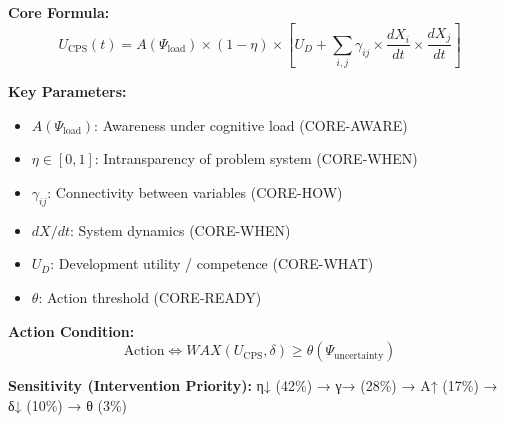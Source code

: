 
\begin{tcolorbox}[colback=blue!5!white, colframe=blue!75!black,
    title=Quick Reference: CPS in 10C]

\textbf{Core Formula:}
\begin{equation}
U_{\text{CPS}}(t) = A(\Psi_{\text{load}}) \times (1-\eta) \times \left[U_D + \sum_{i,j} \gamma_{ij} \times \frac{dX_i}{dt} \times \frac{dX_j}{dt}\right]
\label{eq:cps-utility}
\end{equation}

\textbf{Key Parameters:}
\begin{itemize}[nosep]
\item $A(\Psi_{\text{load}})$: Awareness under cognitive load (CORE-AWARE)
\item $\eta \in [0,1]$: Intransparency of problem system (CORE-WHEN)
\item $\gamma_{ij}$: Connectivity between variables (CORE-HOW)
\item $dX/dt$: System dynamics (CORE-WHEN)
\item $U_D$: Development utility / competence (CORE-WHAT)
\item $\theta$: Action threshold (CORE-READY)
\end{itemize}

\textbf{Action Condition:}
\begin{equation}
\text{Action} \iff WAX(U_{\text{CPS}}, \delta) \geq \theta(\Psi_{\text{uncertainty}})
\end{equation}

\textbf{Sensitivity (Intervention Priority):}
η↓ (42\%) → γ→ (28\%) → A↑ (17\%) → δ↓ (10\%) → θ (3\%)

\end{tcolorbox}


